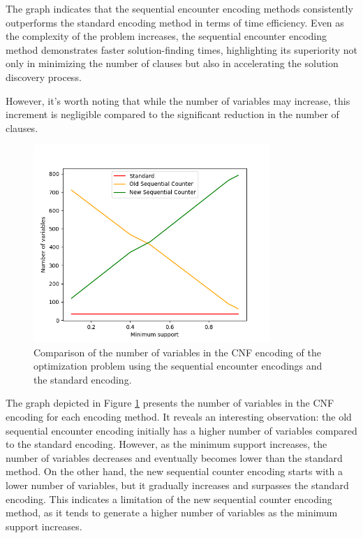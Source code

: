 The graph indicates that the sequential encounter encoding methods consistently outperforms the standard encoding method in terms of time efficiency.
Even as the complexity of the problem increases, the sequential encounter encoding method demonstrates faster solution-finding times,
highlighting its superiority not only in minimizing the number of clauses but also in accelerating the solution discovery process.

However, it's worth noting that while the number of variables may increase, this increment is negligible compared to the significant reduction in the number of clauses.
\begin{figure}[H]
    \centering
    \includegraphics[width=0.8\textwidth]{chapter4/image/n_trans_28_vars.png}
    \caption{Comparison of the number of variables in the CNF encoding of the optimization problem using the sequential encounter encodings and the standard encoding.}
    \label{fig:4_3}
\end{figure}

The graph depicted in Figure \ref{fig:4_3} presents the number of variables in the CNF encoding for each encoding method. It reveals an interesting observation: the old sequential encounter encoding initially has a higher number of variables compared to the standard encoding. However, as the minimum support increases, the number of variables decreases and eventually becomes lower than the standard method. On the other hand, the new sequential counter encoding starts with a lower number of variables, but it gradually increases and surpasses the standard encoding. This indicates a limitation of the new sequential counter encoding method, as it tends to generate a higher number of variables as the minimum support increases.

